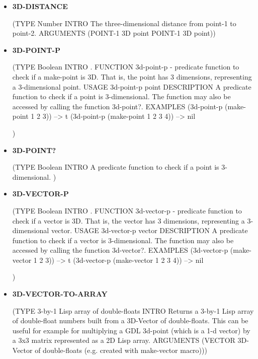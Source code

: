 \documentclass [11pt]{book}
\begin{document}
\label{subsec:functionandmacrodefinitions}



\begin{itemize}

\item {}
\label{prim:3d-distance}
\textbf{3D-DISTANCE}

(TYPE Number INTRO  The three-dimensional distance from
point-1 to point-2.
 ARGUMENTS (POINT-1 3D point POINT-1 3D point))



\item {}
\label{prim:3d-point-p}
\textbf{3D-POINT-P}

(TYPE Boolean INTRO .
 FUNCTION 
3d-point-p - predicate function to check if a make-point is 3D.  That is, the
point has 3 dimensions, representing a 3-dimensional point.
 USAGE 
3d-point-p point
 DESCRIPTION 
A predicate function to check if a point is 3-dimensional.
The function may also be accessed by calling the function 3d-point?.
 EXAMPLES 
(3d-point-p (make-point 1 2 3))
--> t
(3d-point-p (make-point 1 2 3 4))
--> nil

)



\item {}
\label{prim:3d-point?}
\textbf{3D-POINT?}

(TYPE Boolean INTRO  A predicate function to check if a point is 3-dimensional.
)



\item {}
\label{prim:3d-vector-p}
\textbf{3D-VECTOR-P}

(TYPE Boolean INTRO .
 FUNCTION 
3d-vector-p - predicate function to check if a vector is 3D.  That is, the
vector has 3 dimensions, representing a 3-dimensional vector.
 USAGE 
3d-vector-p vector
 DESCRIPTION 
A predicate function to check if a vector is 3-dimensional.
The function may also be accessed by calling the function 3d-vector?.
 EXAMPLES 
(3d-vector-p (make-vector 1 2 3))
--> t
(3d-vector-p (make-vector 1 2 3 4))
--> nil

)



\item {}
\label{prim:3d-vector-to-array}
\textbf{3D-VECTOR-TO-ARRAY}

(TYPE 3-by-1 Lisp array of double-floats INTRO  Returns a 3-by-1 Lisp array of double-float numbers
built from a 3D-Vector of double-floats. This can be useful for example for multiplying
a GDL 3d-point (which is a 1-d vector) by a 3x3 matrix represented as a 2D Lisp array.
 ARGUMENTS (VECTOR 3D-Vector of double-floats (e.g. created with make-vector macro)))




\end{itemize}
\end{document}

